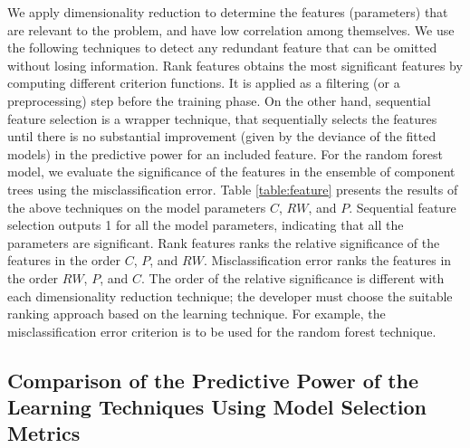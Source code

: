 \documentclass[conference]{IEEEtran}
\begin{document}
We apply dimensionality reduction \cite{Flach:2012:MLA:2490546} to determine the features (parameters) that are relevant to the problem, and have  low correlation among themselves. We use the following techniques to detect any redundant feature that can be omitted without losing information. Rank features obtains the most significant features by computing  different criterion functions. It is applied as a filtering (or a preprocessing) step before the training phase. On the other hand, sequential feature selection is a wrapper technique, that sequentially selects the features until there is no substantial improvement (given by the deviance of the fitted models) in the predictive power for an included feature. For the random forest model, we evaluate the significance of the features in the ensemble of component trees using the misclassification error. Table \ref{table:feature} presents the results of the above techniques on the model parameters  $C$, $RW$, and $P$. Sequential feature selection outputs 1 for all the model parameters, indicating  that all the parameters are significant. Rank features ranks the relative significance of the features in the order $C$, $P$, and $RW$. Misclassification error ranks the features in the order $RW$, $P$, and $C$. The order of the relative significance is different with each dimensionality reduction technique; the developer must choose the suitable ranking approach based on the learning technique. For example, the misclassification error criterion is to be used for the random forest technique.

\subsection{Comparison of the Predictive Power of the Learning Techniques Using Model Selection Metrics}\label{sec:compare}
\end{document}
